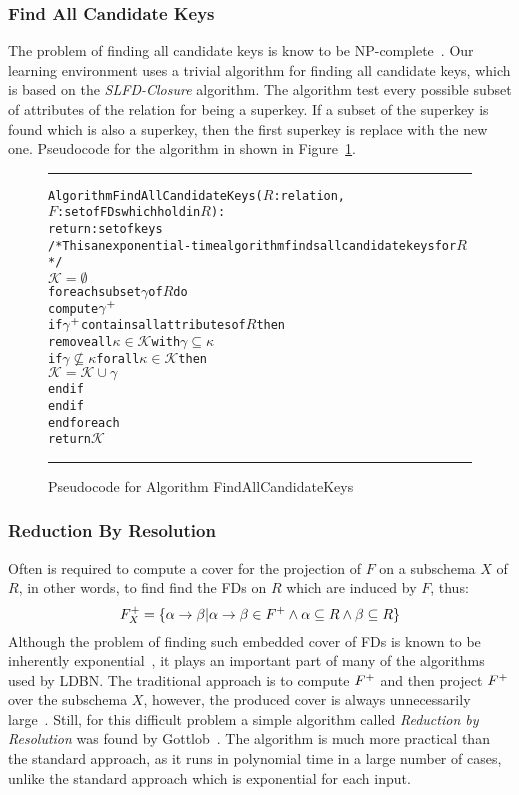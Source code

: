 \subsubsection{Find All Candidate Keys}
The problem of finding all candidate keys is know to be NP-complete~\cite{p3}. 
Our learning environment uses a trivial algorithm for finding all candidate keys,
which is based on the \textit{SLFD-Closure} algorithm. The algorithm test every possible
subset of attributes of the relation for being a superkey. If a subset of the superkey
is found which is also a superkey, then the first superkey is replace with the new one.  
Pseudocode for the algorithm in shown in Figure~\ref{alg:findkeys}. 

\begin{figure}[htbp]
\hrule
\begin{alltt}

Algorithm FindAllCandidateKeys(\(R\): relation,
              \(F\): set of FDs which hold in \(R\)):
            return: set of keys
/* This an exponential-time algorithm finds all candidate keys for \(R\)*/             
  \(\mathcal{K} = \emptyset\)
  foreach subset \(\gamma\) of \(R\) do
    compute \(\gamma\sp{+}\)
    if \(\gamma\sp{+} \) contains all attributes of \(R\) then
      remove all \(\kappa \in \mathcal{K}\) with  \(\gamma \subseteq \kappa\)
      if \(\gamma \nsubseteq \kappa\) for all \(\kappa \in \mathcal{K}\) then
        \(\mathcal{K} = \mathcal{K} \cup \gamma\)
      end if
    end if
  end foreach
  return \(\mathcal{K}\)
\end{alltt}
\caption{Pseudocode for Algorithm FindAllCandidateKeys}\label{alg:findkeys}
\hrule
\end{figure}

\subsubsection{Reduction By Resolution}
Often is required to compute a cover for the projection of $F$ on a subschema $X$ of $R$, in 
other words, to find find the FDs on $R$ which are induced by $F$, thus:
\[ 
  F\sb{X}\sp{+} = \{\alpha\rightarrow\beta | \alpha \rightarrow \beta \in F\sp{+} \wedge \alpha \subseteq R \wedge \beta \subseteq R\}
\]
Although the problem of
finding such embedded cover of FDs is
known to be inherently exponential~\cite{p11}, it plays an important part of many of the algorithms
used by LDBN. The traditional approach is to compute $F\sp{+}$ and then project $F\sp{+}$ over the subschema $X$,
however, the produced cover
is always unnecessarily large~\cite{p4}. Still, for this difficult problem a simple 
algorithm called \textit{Reduction by Resolution}
was found by Gottlob~\cite{p4}. The algorithm is much more practical than the standard approach,
as it runs in polynomial time in a large number of cases, unlike the standard approach
which is exponential for each input. 

